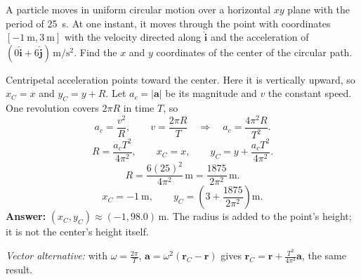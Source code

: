 \quiznextproblem
\begin{problem}[25 pts]
A particle moves in uniform circular motion over a horizontal $xy$ plane
with the period of \qty{25}{\second}. At one instant, it moves through the
point with coordinates $[\qty{-1}{\metre},\qty{3}{\metre}]$ with the
velocity directed along $\hat{\mathbf i}$ and the acceleration of
$(0\hat{\mathbf i}+6\hat{\mathbf j})\,\unit{\metre\per\second\squared}$.
Find the $x$ and $y$ coordinates of the center of the circular path.
\end{problem}
\begin{solution}
Centripetal acceleration points toward the center.
Here it is vertically upward, so $x_C=x$ and $y_C=y+R$.
Let $a_c=|\mathbf a|$ be its magnitude and $v$ the constant speed.
One revolution covers $2\pi R$ in time $T$, so
\[
a_c=\frac{v^2}{R},\qquad v=\frac{2\pi R}{T}
\quad\Longrightarrow\quad a_c=\frac{4\pi^2R}{T^2}.
\]
\[
R=\frac{a_cT^2}{4\pi^2},\qquad
x_C=x,\qquad y_C=y+\frac{a_cT^2}{4\pi^2}.
\]
\[
R=\frac{6(25)^2}{4\pi^2}\,\unit{\metre}
=\frac{1875}{2\pi^2}\,\unit{\metre}.
\]
\[
x_C=\qty{-1}{\metre},\qquad
y_C=\left(3+\frac{1875}{2\pi^2}\right)\unit{\metre}.
\]
\textbf{Answer:} $(x_C,y_C)\approx(-1,98.0)\,\unit{\metre}$.
The radius is added to the point's height; it is not the center's height itself.

\textit{Vector alternative:} with $\omega=\frac{2\pi}{T}$,
$\mathbf a=\omega^2(\mathbf r_C-\mathbf r)$ gives
$\mathbf r_C=\mathbf r+\frac{T^2}{4\pi^2}\mathbf a$, the same result.
\end{solution}
